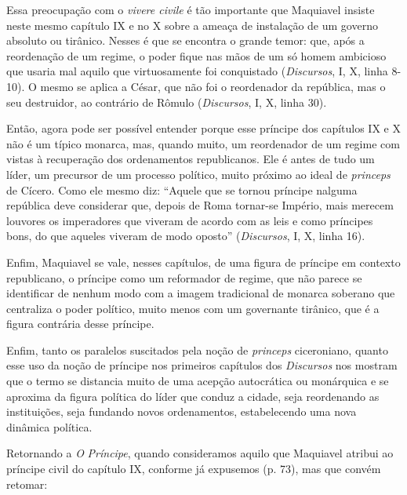 Essa preocupação com o \emph{vivere civile} é tão importante que
Maquiavel insiste neste mesmo capítulo IX e no X sobre a ameaça de
instalação de um governo absoluto ou tirânico. Nesses é que se encontra
o grande temor: que, após a reordenação de um regime, o poder fique nas
mãos de um só homem ambicioso que usaria mal aquilo que virtuosamente
foi conquistado (\emph{Discursos}, I, X, linha 8-10). O mesmo se aplica
a César, que não foi o reordenador da república, mas o seu destruidor,
ao contrário de Rômulo (\emph{Discursos}, I, X, linha 30).

Então, agora pode ser possível entender porque esse príncipe dos
capítulos IX e X não é um típico monarca, mas, quando muito, um
reordenador de um regime com vistas à recuperação dos ordenamentos
republicanos. Ele é antes de tudo um líder, um precursor de um processo
político, muito próximo ao ideal de \emph{princeps} de Cícero. Como ele
mesmo diz: ``Aquele que se tornou príncipe nalguma república deve
considerar que, depois de Roma tornar-se Império, mais merecem louvores
os imperadores que viveram de acordo com as leis e como príncipes bons,
do que aqueles viveram de modo oposto'' (\emph{Discursos}, I, X, linha
16).

Enfim, Maquiavel se vale, nesses capítulos, de uma figura de príncipe em
contexto republicano, o príncipe como um reformador de regime, que não
parece se identificar de nenhum modo com a imagem tradicional de monarca
soberano que centraliza o poder político, muito menos com um governante
tirânico, que é a figura contrária desse príncipe.

Enfim, tanto os paralelos suscitados pela noção de \emph{princeps}
ciceroniano, quanto esse uso da noção de príncipe nos primeiros
capítulos dos \emph{Discursos} nos mostram que o termo se distancia
muito de uma acepção autocrática ou monárquica e se aproxima da figura
política do líder que conduz a cidade, seja reordenando as instituições,
seja fundando novos ordenamentos, estabelecendo uma nova dinâmica
política.

Retornando a \emph{O} \emph{Príncipe}, quando consideramos aquilo que
Maquiavel atribui ao príncipe civil do capítulo IX, conforme já
expusemos (p. 73), mas que convém retomar:

